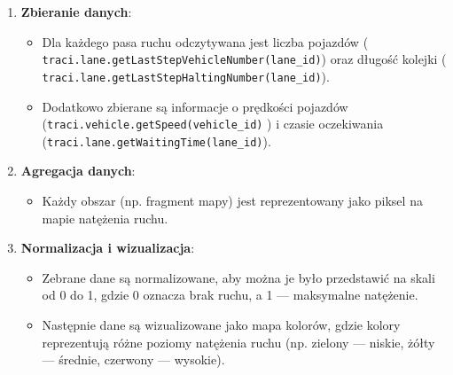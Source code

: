 \documentclass[12pt, a4paper]{article} %
\begin{document}
    \begin{enumerate}
        \item \textbf{Zbieranie danych}:
        \begin{itemize}
            \item Dla każdego pasa ruchu odczytywana jest liczba pojazdów (
            \texttt{traci.lane.getLastStepVehicleNumber(lane\_id)}) oraz długość kolejki (
            \texttt{traci.lane.getLastStepHaltingNumber(lane\_id)}).
            \item Dodatkowo zbierane są informacje o prędkości pojazdów (\texttt{traci.vehicle.getSpeed(vehicle\_id)}
            ) i czasie oczekiwania (\texttt{traci.lane.getWaitingTime(lane\_id)}).
        \end{itemize}

        \item \textbf{Agregacja danych}:
        \begin{itemize}
            \itemDane z poszczególnych pasów ruchu są agregowane w celu uzyskania informacji o natężeniu ruchu na całym
            obszarze.
            \item Każdy obszar (np. fragment mapy) jest reprezentowany jako piksel na mapie natężenia ruchu.
        \end{itemize}

        \item \textbf{Normalizacja i wizualizacja}:
        \begin{itemize}
            \item
            Zebrane dane są normalizowane, aby można je było przedstawić na skali od 0 do 1, gdzie 0 oznacza brak ruchu,
            a 1 — maksymalne natężenie.
            \item
            Następnie dane są wizualizowane jako mapa kolorów, gdzie kolory reprezentują różne poziomy natężenia ruchu
            (np. zielony — niskie, żółty — średnie, czerwony — wysokie).
        \end{itemize}
    \end{enumerate}
\end{document}
